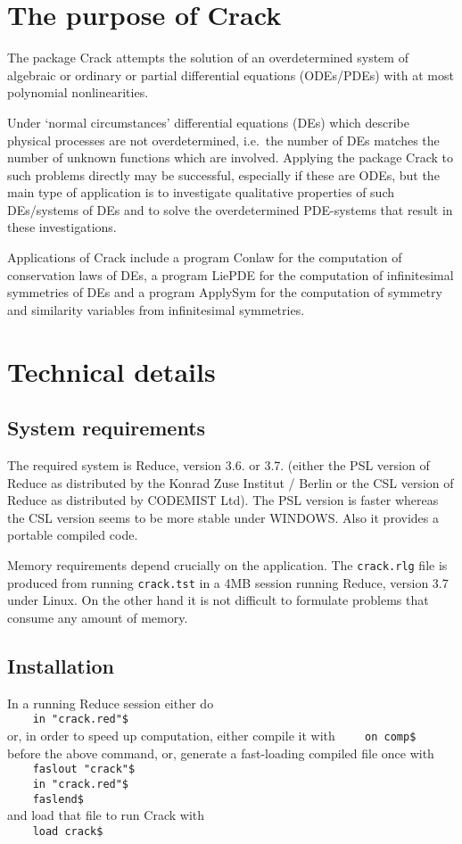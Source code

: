 \documentclass[12pt]{article}
\begin{document}
\section{The purpose of  Crack}
The package {\sc Crack} attempts the solution of an overdetermined 
system of algebraic or ordinary or partial differential 
equations (ODEs/PDEs) with at most polynomial nonlinearities. 

Under `normal circumstances' differential 
equations (DEs) which describe physical
processes are not overdetermined, i.e.\ the number of DEs
matches the number of unknown functions which are involved.
Applying the package {\sc Crack} to such problems directly may be
successful, especially if these are ODEs, but the main type of
application is to investigate qualitative properties of such DEs/systems
of DEs and to solve the overdetermined PDE-systems that result in these
investigations.

Applications of {\sc Crack} include a program {\sc Conlaw}
for the computation of conservation laws of DEs, a program 
{\sc LiePDE} for the computation of infinitesimal symmetries of DEs
and a program {\sc ApplySym} for the computation of symmetry and 
similarity variables from infinitesimal symmetries.

\section{Technical details}  
\subsection{System requirements} 
The required system is {\sc Reduce}, version
3.6. or 3.7. (either the PSL version of {\sc Reduce} as distributed by
the Konrad Zuse Institut / Berlin or the CSL version of {\sc Reduce}
 as distributed by CODEMIST Ltd). The PSL version is faster whereas
the CSL version seems to be more stable under WINDOWS. Also it
provides a portable compiled code.

Memory requirements depend crucially on the
application. The {\tt crack.rlg} file is produced from running 
{\tt crack.tst} in a 4MB session running {\sc Reduce}, version 3.7 under
{\sc Linux}. On the other hand it is not difficult to formulate problems that 
consume any amount of memory.

\subsection{Installation}
In a running {\sc Reduce} session either do \\
\verb+    in "crack.red"$ + \\
or, in order to speed up computation, either compile it with 
\verb+    on comp$ + \\
before the above command, or, generate a fast-loading compiled 
file once with \\
\verb+    faslout "crack"$ + \\
\verb+    in "crack.red"$ + \\
\verb+    faslend$ + \\
and load that file to run {\sc Crack} with \\
\verb+    load crack$ + 
\end{document}
